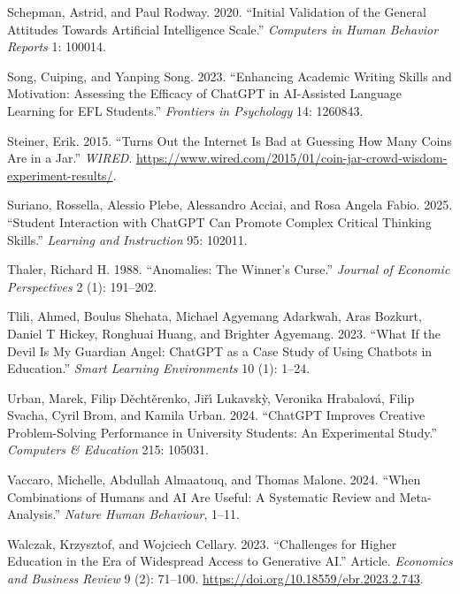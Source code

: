 \documentclass[
  12pt,
]{article}
\newlength{\cslhangindent}
\newenvironment{CSLReferences}[2] %
 {\begin{list}{}{%
  \setlength{\itemindent}{0pt}
  \setlength{\leftmargin}{0pt}
  \setlength{\parsep}{0pt}
  \ifodd #1
   \setlength{\leftmargin}{\cslhangindent}
   \setlength{\itemindent}{-1\cslhangindent}
  \fi
  \setlength{\itemsep}{#2\baselineskip}}}
 {\end{list}}
\begin{document}
\begin{CSLReferences}{1}{0}
Schepman, Astrid, and Paul Rodway. 2020. {``Initial Validation of the General Attitudes Towards Artificial Intelligence Scale.''} \emph{Computers in Human Behavior Reports} 1: 100014.

Song, Cuiping, and Yanping Song. 2023. {``Enhancing Academic Writing Skills and Motivation: Assessing the Efficacy of ChatGPT in AI-Assisted Language Learning for EFL Students.''} \emph{Frontiers in Psychology} 14: 1260843.

Steiner, Erik. 2015. {``Turns Out the Internet Is Bad at Guessing How Many Coins Are in a Jar.''} \emph{WIRED}. \url{https://www.wired.com/2015/01/coin-jar-crowd-wisdom-experiment-results/}.

Suriano, Rossella, Alessio Plebe, Alessandro Acciai, and Rosa Angela Fabio. 2025. {``Student Interaction with ChatGPT Can Promote Complex Critical Thinking Skills.''} \emph{Learning and Instruction} 95: 102011.

Thaler, Richard H. 1988. {``Anomalies: The Winner's Curse.''} \emph{Journal of Economic Perspectives} 2 (1): 191--202.

Tlili, Ahmed, Boulus Shehata, Michael Agyemang Adarkwah, Aras Bozkurt, Daniel T Hickey, Ronghuai Huang, and Brighter Agyemang. 2023. {``What If the Devil Is My Guardian Angel: ChatGPT as a Case Study of Using Chatbots in Education.''} \emph{Smart Learning Environments} 10 (1): 1--24.

Urban, Marek, Filip Děchtěrenko, Jiřı́ Lukavskỳ, Veronika Hrabalová, Filip Svacha, Cyril Brom, and Kamila Urban. 2024. {``ChatGPT Improves Creative Problem-Solving Performance in University Students: An Experimental Study.''} \emph{Computers \& Education} 215: 105031.

Vaccaro, Michelle, Abdullah Almaatouq, and Thomas Malone. 2024. {``When Combinations of Humans and AI Are Useful: A Systematic Review and Meta-Analysis.''} \emph{Nature Human Behaviour}, 1--11.

Walczak, Krzysztof, and Wojciech Cellary. 2023. {``Challenges for Higher Education in the Era of Widespread Access to Generative AI.''} Article. \emph{Economics and Business Review} 9 (2): 71--100. \url{https://doi.org/10.18559/ebr.2023.2.743}.


\end{CSLReferences}
\end{document}
